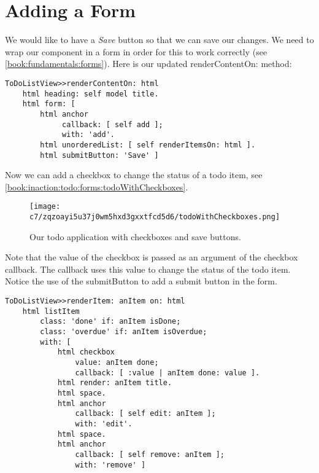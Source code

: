\documentclass[a4paper,10pt,twoside]{book}
\newcommand{\ct}[1]{{\small\ttfamily\textup{#1}}}
\begin{document}
\section{Adding a Form}
\label{book:inaction:todo:forms}

We would like to have a \textit{Save} button so that we can save our changes. We need to wrap our component in a form in order for this to work correctly (see \autoref{book:fundamentals:forms}). Here is our updated \ct{renderContentOn:} method:

\begin{lstlisting}
ToDoListView>>renderContentOn: html
    html heading: self model title.
    html form: [
        html anchor 
             callback: [ self add ];
             with: 'add'.
        html unorderedList: [ self renderItemsOn: html ].
        html submitButton: 'Save' ]
\end{lstlisting}

Now we can add a checkbox to change the status of a todo item, see \autoref{book:inaction:todo:forms:todoWithCheckboxes}. 

\begin{figure}[h!tbp]
	\begin{center}
		\texttt{[image: c7/zqzoayi5u37j0wm5hxd3gxxtfcd5d6/todoWithCheckboxes.png]}
		\caption{Our todo application with checkboxes and save buttons.\label{book:inaction:todo:forms:todoWithCheckboxes}}
	\end{center}
\end{figure}


Note that the value of the checkbox is passed as an argument of the checkbox callback. The callback uses this value to change the status of the todo item. Notice the use of the  \ct{submitButton} to add a submit button in the form.

\begin{lstlisting}
ToDoListView>>renderItem: anItem on: html
    html listItem
        class: 'done' if: anItem isDone;
        class: 'overdue' if: anItem isOverdue;
        with: [
            html checkbox
                value: anItem done;
                callback: [ :value | anItem done: value ].
            html render: anItem title.
            html space.
            html anchor
                callback: [ self edit: anItem ];
                with: 'edit'.
            html space.
            html anchor
                callback: [ self remove: anItem ];
                with: 'remove' ]
\end{lstlisting}
\end{document}
